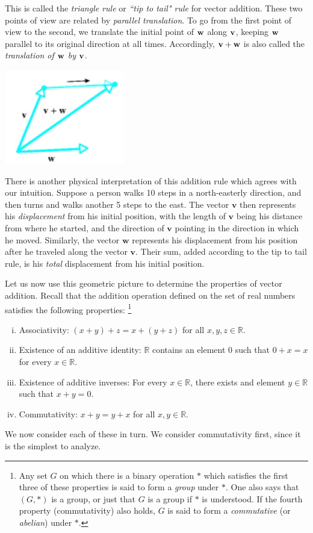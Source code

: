 \documentclass[12pt,letterpaper,reqno]{article}
\numberwithin{equation}{section}
\newcommand{\ti}[1]{\textit{#1}}
\begin{document}
This is called the \ti{triangle rule} or \ti{``tip to tail" rule} for vector addition. These two points of view are related by \ti{parallel translation}. To go from the first point of view to the second, we translate the initial point of ${\bf w}$ along ${\bf v}$, keeping ${\bf w}$ parallel to its original direction at all times. Accordingly, ${\bf v}+{\bf w}$ is also called the \ti{translation of ${\bf w}$ by ${\bf v}$}.
\begin{center}
	\includegraphics[scale=0.5]{figures_mvc/translation_of_v_by_w}
\end{center}

\begin{example}
There is another physical interpretation of this addition rule which agrees with our intuition. Suppose a person walks 10 steps in a north-easterly direction, and then turns and walks another 5 steps to the east. The vector $\mathbf{v}$ then represents his \emph{displacement} from his initial position, with the length of $\mathbf{v}$ being his distance from where he started, and the direction of $\mathbf{v}$ pointing in the direction in which he moved. Similarly, the vector $\mathbf{w}$ represents his displacement from his position after he traveled along the vector $\mathbf{v}$. Their sum, added according to the tip to tail rule, is his \emph{total} displacement from his initial position.	
\end{example}

Let us now use this geometric picture to determine the properties of vector addition. Recall that the addition operation defined on the set of real numbers satisfies the following properties: \footnote{Any set $G$ on which there is a binary operation $*$ which satisfies the first three of these properties is said to form a \emph{group} under $*$. One also says that $(G,*)$ is a group, or just that $G$ is a group if $*$ is understood. If the fourth property (commutativity) also holds, $G$ is said to form a \emph{commutative} (or \emph{abelian}) under $*$.}
\begin{enumerate}[(i)]
	\item Associativity: $(x+y)+z=x+(y+z)$ for all $x,y,z \in \mathbb{R}$.
	\item Existence of an additive identity: $\mathbb{R}$ contains an element 0 such that $0+x=x$ for every $x \in \mathbb{R}$.
	\item Existence of additive inverses: For every $x \in \mathbb{R}$, there exists and element $y \in \mathbb{R}$ such that $x+y=0$.
	\item Commutativity: $x+y=y+x$ for all $x,y \in \mathbb{R}$.
\end{enumerate}
We now consider each of these in turn. We consider commutativity first, since it is the simplest to analyze.
\end{document}
